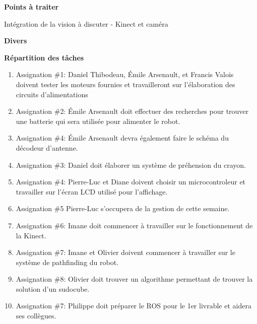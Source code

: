 \documentclass[12pt]{ULojpv}
\begin{document}
\item \textbf{Points à traiter}

\item Intégration de la vision à discuter - Kinect et caméra

\item \textbf{Divers}

\item \textbf{Répartition des tâches}

\begin{enumerate}

\item Assignation \#1: Daniel Thibodeau, Émile Arsenault, et Francis Valois doivent tester les moteurs fournies et travailleront sur l'élaboration des circuits d'alimentations

\item Assignation \#2: Émile Arsenault doit effectuer des recherches pour trouver une batterie qui sera utilisée pour alimenter le robot.

\item Assignation \#4: Émile Arsenault devra également faire le schéma du décodeur d'antenne.

\item Assignation \#3: Daniel doit élaborer un système de préhension du crayon.

\item Assignation \#4: Pierre-Luc et Diane doivent choisir un microcontroleur et travailler sur l'écran LCD utilisé pour l'affichage.

\item Assignation \#5 Pierre-Luc s'occupera de la gestion de cette semaine.

\item Assignation \#6: Imane doit commencer à travailler sur le fonctionnement de la Kinect.

\item Assignation \#7: Imane et Olivier doivent commencer à travailler sur le système de pathfinding du robot.

\item Assignation \#8: Olivier doit trouver un algorithme permettant de trouver la solution d'un sudocube.

\item Assignation \#7: Philippe doit préparer le ROS pour le 1er livrable et aidera ses collègues.

\end{enumerate}
\end{document}
